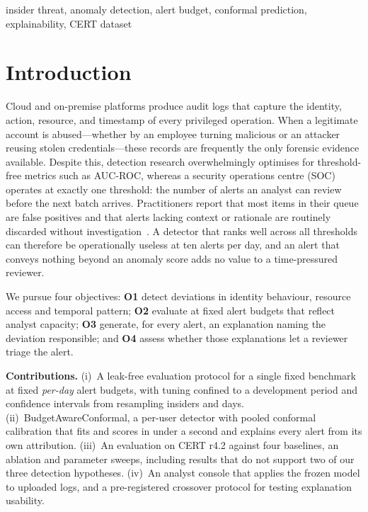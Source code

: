 \documentclass[conference]{IEEEtran}
\begin{document}
\begin{IEEEkeywords}
insider threat, anomaly detection, alert budget, conformal prediction, explainability, CERT dataset
\end{IEEEkeywords}

\section{Introduction}
Cloud and on-premise platforms produce audit logs that capture the identity, action, resource, and
timestamp of every privileged operation. When a legitimate account is abused---whether by an
employee turning malicious or an attacker reusing stolen credentials---these records are frequently
the only forensic evidence available. Despite this, detection research overwhelmingly optimises for
threshold-free metrics such as AUC-ROC, whereas a security operations centre (SOC) operates at
exactly one threshold: the number of alerts an analyst can review before the next batch arrives.
Practitioners report that most items in their queue are false positives and that alerts lacking
context or rationale are routinely discarded without investigation~\cite{alahmadi2022false}.
A detector that ranks well across all thresholds can therefore be operationally useless at ten
alerts per day, and an alert that conveys nothing beyond an anomaly score adds no value to a
time-pressured reviewer.

We pursue four objectives: \textbf{O1} detect deviations in identity behaviour, resource access
and temporal pattern; \textbf{O2} evaluate at fixed alert budgets that reflect analyst capacity;
\textbf{O3} generate, for every alert, an explanation naming the deviation responsible; and
\textbf{O4} assess whether those explanations let a reviewer triage the alert.

\textbf{Contributions.} (i)~A leak-free evaluation protocol for a single fixed benchmark at fixed
\emph{per-day} alert budgets, with tuning confined to a development period and confidence intervals
from resampling insiders and days. (ii)~BudgetAwareConformal, a per-user detector with pooled
conformal calibration that fits and scores in under a second and explains every alert from its own
attribution. (iii)~An evaluation on CERT r4.2 against four baselines, an ablation and parameter
sweeps, including results that do not support two of our three detection hypotheses. (iv)~An
analyst console that applies the frozen model to uploaded logs, and a pre-registered crossover
protocol for testing explanation usability.
\end{document}
